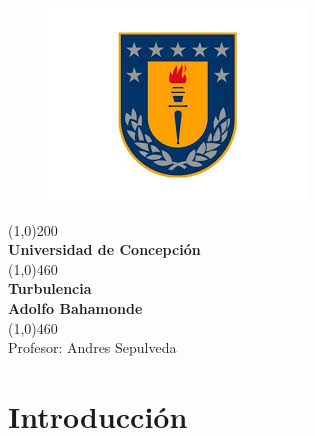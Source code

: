 \documentclass[executivepaper,12pt]{article}
\numberwithin{equation}{section}
\begin{document}
\begin{titlepage}
	\begin{center}
		\begin{figure}[H]
			\centering
			\includegraphics[scale=0.3]{escudo}
		\end{figure}
		\vspace{-0.5cm}
		\line(1,0){200}\\[0.5cm]
		\Large \textbf{Universidad de Concepción} \\[4cm]
		\line(1,0){460}\\[1mm]
		\huge{\textbf{Turbulencia}}\\[3mm]
		\Large \textbf{Adolfo Bahamonde}\\[1mm]
		\line(1,0){460}\\
		\vfill
		Profesor: Andres Sepulveda\\
	\end{center}
\end{titlepage}

\tableofcontents
\thispagestyle{empty}
\clearpage

\setcounter{page}{1}
\section{Introducción}
\end{document}
